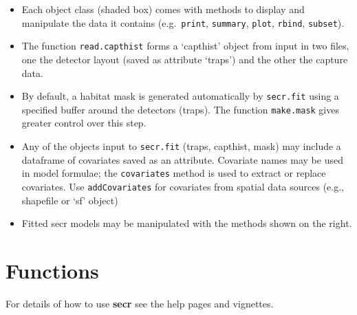 \documentclass[
]{book}
\providecommand{\tightlist}{%
  \setlength{\itemsep}{0pt}\setlength{\parskip}{0pt}}
\begin{document}
\begin{itemize}
\tightlist
\item
  Each object class (shaded box) comes with methods to display and manipulate the data it contains (e.g.~\texttt{print}, \texttt{summary}, \texttt{plot}, \texttt{rbind}, \texttt{subset}).
\item
  The function \texttt{read.capthist} forms a `capthist' object from input in two files, one the detector layout (saved as attribute `traps') and the other the capture data.
\item
  By default, a habitat mask is generated automatically by \texttt{secr.fit} using a specified buffer around the detectors (traps). The function \texttt{make.mask} gives greater control over this step.
\item
  Any of the objects input to \texttt{secr.fit} (traps, capthist, mask) may include a dataframe of covariates saved as an attribute. Covariate names may be used in model formulae; the \texttt{covariates} method is used to extract or replace covariates. Use \texttt{addCovariates} for covariates from spatial data sources (e.g., shapefile or `sf' object)
\item
  Fitted secr models may be manipulated with the methods shown on the right.
\end{itemize}

\section{Functions}\label{functions}


For details of how to use \textbf{secr} see the help pages and vignettes.
\end{document}
